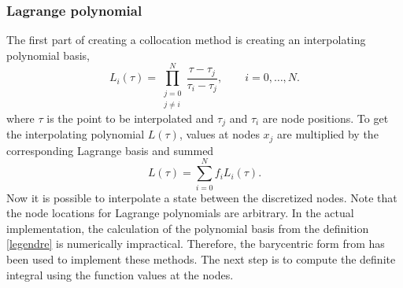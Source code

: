 \subsubsection{Lagrange polynomial}
The first part of creating a collocation method is creating an interpolating polynomial basis,
\begin{equation}
    L_i(\tau) = \prod_{\substack{j=0 \\ j \neq i}}^{N} \frac{\tau - \tau_j}{\tau_i - \tau_j}, \qquad i = 0, \ldots, N.
    \label{legendre}
\end{equation}
where $\tau$ is the point to be interpolated and $\tau_j$ and $\tau_i$ are node positions. To get the interpolating polynomial $L(\tau)$, values at nodes $x_j$ are multiplied by the corresponding Lagrange basis and summed
\begin{equation}
    L(\tau) = \sum_{i=0}^{N} f_{i} L_i(\tau).
\end{equation}
Now it is possible to interpolate a state between the discretized nodes. Note that the node locations for Lagrange polynomials are arbitrary. In the actual implementation, the calculation of the polynomial basis from the definition \ref{legendre} is numerically impractical. Therefore, the barycentric form from \cite{berrutBarycentricLagrangeInterpolation2004} has been used to implement these methods. The next step is to compute the definite integral using the function values at the nodes.
